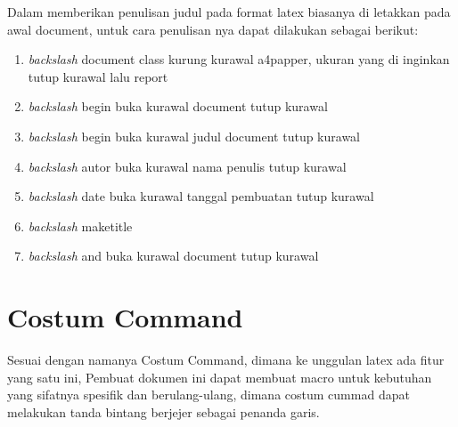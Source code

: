 Dalam memberikan penulisan judul pada format latex biasanya di letakkan pada awal document, untuk cara penulisan nya dapat dilakukan sebagai berikut:
\begin{enumerate}
  \item \textit{backslash} document class kurung kurawal a4papper, ukuran yang di inginkan tutup kurawal lalu report
  \item \textit{backslash} begin buka kurawal document tutup kurawal
  \item \textit{backslash} begin buka kurawal judul document tutup kurawal
  \item \textit{backslash} autor buka kurawal nama penulis tutup kurawal
  \item \textit{backslash} date buka kurawal tanggal pembuatan tutup kurawal
  \item \textit{backslash} maketitle
  \item \textit{backslash} and buka kurawal document tutup kurawal
\end{enumerate}

\section{Costum Command}
Sesuai  dengan  namanya Costum Command, dimana ke unggulan latex ada fitur yang satu ini, Pembuat dokumen ini dapat  membuat macro untuk kebutuhan yang sifatnya spesifik dan berulang-ulang, dimana costum cummad dapat melakukan tanda bintang berjejer sebagai penanda garis.





